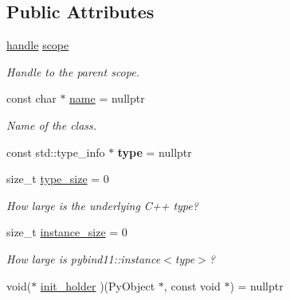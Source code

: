 \subsection*{Public Attributes}
\begin{DoxyCompactItemize}
\item 
\hyperlink{classhandle}{handle} \hyperlink{structtype__record_ab188820ddf461b3b49818f34885c5687}{scope}\hypertarget{structtype__record_ab188820ddf461b3b49818f34885c5687}{}\label{structtype__record_ab188820ddf461b3b49818f34885c5687}

\begin{DoxyCompactList}\small\item\em Handle to the parent scope. \end{DoxyCompactList}\item 
const char $\ast$ \hyperlink{structtype__record_aaf93cf029bb1a9686fd5e72c16ea81a8}{name} = nullptr\hypertarget{structtype__record_aaf93cf029bb1a9686fd5e72c16ea81a8}{}\label{structtype__record_aaf93cf029bb1a9686fd5e72c16ea81a8}

\begin{DoxyCompactList}\small\item\em Name of the class. \end{DoxyCompactList}\item 
const std\+::type\+\_\+info $\ast$ {\bfseries type} = nullptr\hypertarget{structtype__record_a9b25042abe2522e477656878280c5368}{}\label{structtype__record_a9b25042abe2522e477656878280c5368}

\item 
size\+\_\+t \hyperlink{structtype__record_aa49cb21026b070945a61a29f081a2442}{type\+\_\+size} = 0\hypertarget{structtype__record_aa49cb21026b070945a61a29f081a2442}{}\label{structtype__record_aa49cb21026b070945a61a29f081a2442}

\begin{DoxyCompactList}\small\item\em How large is the underlying C++ type? \end{DoxyCompactList}\item 
size\+\_\+t \hyperlink{structtype__record_ab956502be867c8bec19856c81c0b1b1d}{instance\+\_\+size} = 0\hypertarget{structtype__record_ab956502be867c8bec19856c81c0b1b1d}{}\label{structtype__record_ab956502be867c8bec19856c81c0b1b1d}

\begin{DoxyCompactList}\small\item\em How large is pybind11\+::instance$<$type$>$? \end{DoxyCompactList}\item 
void($\ast$ \hyperlink{structtype__record_a43adb8a6a8fc29463da376c175c8d54e}{init\+\_\+holder} )(Py\+Object $\ast$, const void $\ast$) = nullptr\hypertarget{structtype__record_a43adb8a6a8fc29463da376c175c8d54e}{}\label{structtype__record_a43adb8a6a8fc29463da376c175c8d54e}


\end{DoxyCompactItemize}
